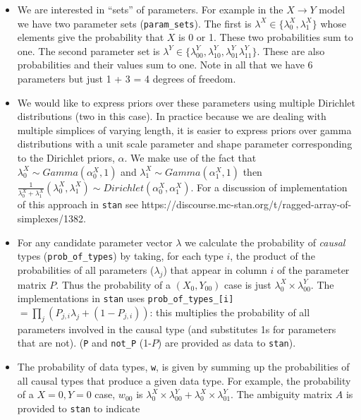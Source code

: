 \documentclass[
  article]{jss}
\begin{document}
\begin{itemize}
\item
  We are interested in ``sets'' of parameters. For example in the
  \(X \rightarrow Y\) model we have two parameter sets
  (\texttt{param\_sets}). The first is
  \(\lambda^X \in \{\lambda^X_0, \lambda^X_1\}\) whose elements give the
  probability that \(X\) is 0 or 1. These two probabilities sum to one.
  The second parameter set is
  \(\lambda^Y \in \{\lambda^Y_{00}, \lambda^Y_{10}, \lambda^Y_{01} \lambda^Y_{11}\}\).
  These are also probabilities and their values sum to one. Note in all
  that we have 6 parameters but just 1 + 3 = 4 degrees of freedom.
\item
  We would like to express priors over these parameters using multiple
  Dirichlet distributions (two in this case). In practice because we are
  dealing with multiple simplices of varying length, it is easier to
  express priors over gamma distributions with a unit scale parameter
  and shape parameter corresponding to the Dirichlet priors, \(\alpha\).
  We make use of the fact that \(\lambda^X_0 \sim Gamma(\alpha^X_0,1)\)
  and \(\lambda^X_1 \sim Gamma(\alpha^X_1,1)\) then
  \(\frac{1}{\lambda^X_0 +\lambda^X_1}(\lambda^X_0, \lambda^X_1) \sim Dirichlet(\alpha^X_0, \alpha^X_1)\).
  For a discussion of implementation of this approach in \texttt{stan}
  see https://discourse.mc-stan.org/t/ragged-array-of-simplexes/1382.
\item
  For any candidate parameter vector \(\lambda\) we calculate the
  probability of \emph{causal} types (\texttt{prob\_of\_types}) by
  taking, for each type \(i\), the product of the probabilities of all
  parameters (\(\lambda_j\)) that appear in column \(i\) of the
  parameter matrix \(P\). Thus the probability of a \((X_0,Y_{00})\)
  case is just \(\lambda^X_0 \times \lambda^Y_{00}\). The
  implementations in \texttt{stan} uses
  \texttt{prob\_of\_types\_{[}i{]}}
  \(= \prod_j \left(P_{j,i} \lambda_j + (1-P_{j,i})\right)\): this
  multiplies the probability of all parameters involved in the causal
  type (and substitutes 1s for parameters that are not). (\texttt{P} and
  \texttt{not\_P} (1-\(P\)) are provided as data to \texttt{stan}).
\item
  The probability of data types, \texttt{w}, is given by summing up the
  probabilities of all causal types that produce a given data type. For
  example, the probability of a \(X=0,Y=0\) case, \(w_{00}\) is
  \(\lambda^X_0\times \lambda^Y_{00} + \lambda^X_0\times \lambda^Y_{01}\).
  The ambiguity matrix \(A\) is provided to \texttt{stan} to indicate

\end{itemize}
\end{document}

